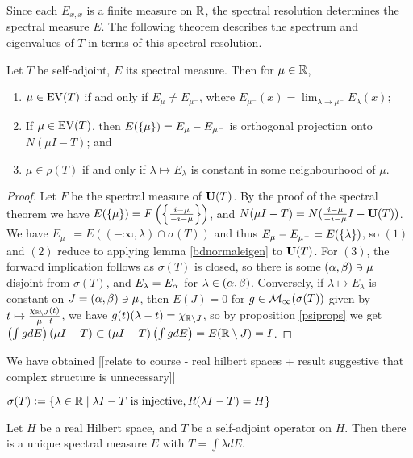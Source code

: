 \documentclass[10pt]{amsart}
\begin{document}
Since each $E_{x, x}$ is a finite measure on $\mathbb{R}$, the spectral resolution determines the spectral measure $E$. The following theorem describes the spectrum and eigenvalues of $T$ in terms of this spectral resolution.
\begin{theorem}
    Let $T$ be self-adjoint, $E$ its spectral measure. Then for $\mu \in \mathbb{R}$,
    \begin{enumerate}
        \item $\mu \in \operatorname{EV}(T)$ if and only if $E_\mu \neq E_{\mu^-}$, where $E_{\mu^-}(x) = \lim_{\lambda \to \mu^-}E_\lambda(x)$;
        \item If $\mu \in \operatorname{EV}(T)$, then $E(\left\{  \mu  \right\}) = E_\mu - E_{\mu^-}$ is orthogonal projection onto $N(\mu I - T)$; and
        \item $\mu \in \rho(T)$ if and only if $\lambda \mapsto E_\lambda$ is constant in some neighbourhood of $\mu$.
    \end{enumerate}
\end{theorem}
\begin{proof}
    Let $F$ be the spectral measure of $\mathbf{U}(T)$. By the proof of the spectral theorem we have $E(\left\{  \mu  \right\}) = F\left(  \left\{  \frac{i - \mu}{-i - \mu}  \right\}  \right)$, and $N(\mu I - T) = N(\frac{i - \mu}{-i - \mu}I - \mathbf{U}(T))$. We have $E_{\mu^-} = E((-\infty, \lambda) \cap \sigma(T))$ and thus $E_{\mu} - E_{\mu^-} = E(\left\{  \lambda  \right\})$, so $(1)$ and $(2)$ reduce to applying lemma \ref{bdnormaleigen} to $\mathbf{U}(T)$. For $(3)$, the forward implication follows as $\sigma(T)$ is closed, so there is some $(\alpha, \beta) \ni \mu$ disjoint from $\sigma(T)$, and $E_\lambda = E_\alpha$ for $\lambda \in (\alpha, \beta)$. Conversely, if $\lambda \mapsto E_\lambda$ is constant on $J = (\alpha, \beta) \ni \mu$, then $E(J) = 0$ for $g \in \mathcal{M}_\infty(\sigma(T))$ given by $t \mapsto \frac{\chi_{\mathbb{R} \setminus J}(t)}{\mu - t}$, we have $g(t)(\lambda - t) = \chi_{\mathbb{R} \setminus J}$, so by proposition \ref{psiprops} we get $\left(  \int g dE  \right)(\mu I - T) \subset (\mu I - T)\left(  \int g dE  \right) = E(\mathbb{R} \setminus J) = I$.
\end{proof}
We have obtained [[relate to course - real hilbert spaces + result suggestive that complex structure is unnecessary]]
\begin{definition}
    $\sigma(T) \vcentcolon= \left\{  \lambda \in \mathbb{R} \mid \lambda I - T \text{ is injective}, R(\lambda I - T) = H  \right\}$
\end{definition}
\begin{theorem}
    Let $H$ be a real Hilbert space, and $T$ be a self-adjoint operator on $H$. Then there is a unique spectral measure $E$ with $T = \int \lambda dE$.
\end{theorem}
\end{document}
